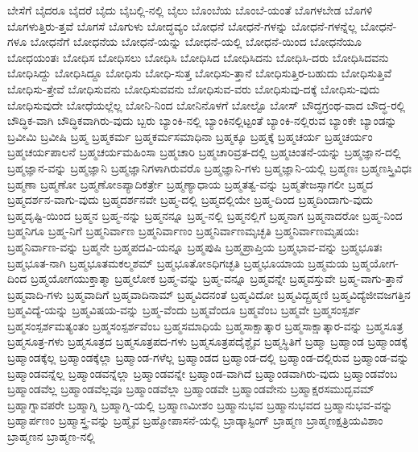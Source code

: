{ಬೇಸೆಗೆ
ಬೈದರೂ
ಬೈದರೆ
ಬೈದು
ಬೈಬಲ್ಲಿ-ನಲ್ಲಿ
ಬೈಲು
ಬೊಂಬೆಯ
ಬೊಂಬೆ-ಯಂತೆ
ಬೊಗಳಬೇಡ
ಬೊಗಳಿ
ಬೊಗಳುತ್ತಿರು-ತ್ತವೆ
ಬೊಗಸೆ
ಬೊಗುಳು
ಬೋದ್ಧವ್ಯಂ
ಬೋಧನೆ
ಬೋಧನೆ-ಗಳನ್ನು
ಬೋಧನೆ-ಗಳನ್ನೆಲ್ಲ
ಬೋಧನೆ-ಗಳೂ
ಬೋಧನೆಗೆ
ಬೋಧನೆಯ
ಬೋಧನೆ-ಯನ್ನು
ಬೋಧನೆ-ಯಲ್ಲಿ
ಬೋಧನೆ-ಯಿಂದ
ಬೋಧನೆಯೂ
ಬೋಧಯಂತಃ
ಬೋಧಿಸ
ಬೋಧಿಸಲು
ಬೋಧಿಸಿ
ಬೋಧಿಸಿದ
ಬೋಧಿಸಿದನು
ಬೋಧಿಸಿ-ದರು
ಬೋಧಿಸಿದವನು
ಬೋಧಿಸಿದ್ದು
ಬೋಧಿಸಿದ್ದೂ
ಬೋಧಿಸು
ಬೋಧಿ-ಸುತ್ತ
ಬೋಧಿಸು-ತ್ತಾನೆ
ಬೋಧಿಸುತ್ತಿರ-ಬಹುದು
ಬೋಧಿಸುತ್ತಿವೆ
ಬೋಧಿಸು-ತ್ತೇವೆ
ಬೋಧಿಸುವನು
ಬೋಧಿಸುವವನು
ಬೋಧಿಸುವ-ವರು
ಬೋಧಿಸುವು-ದಕ್ಕೆ
ಬೋಧಿಸು-ವುದು
ಬೋಧಿಸುವುದೇ
ಬೋಧೆಯಲ್ಲೆಲ್ಲ
ಬೋನಿ-ನಿಂದ
ಬೋನಿನೊಳಗೆ
ಬೋಲ್ಟೊ
ಬೋಸ್
ಬೌದ್ಧಗ್ರಂಥ-ವಾದ
ಬೌದ್ಧ-ರಲ್ಲಿ
ಬೌದ್ಧಿಕ-ವಾಗಿ
ಬೌದ್ಧಿಕವಾಗಿರು-ವುದು
ಬ್ಬರು
ಬ್ಯಾಂಕಿ-ನಲ್ಲಿ
ಬ್ಯಾಂಕಿನಲ್ಲಿಟ್ಟಂತೆ
ಬ್ಯಾಂಕಿ-ನಲ್ಲಿರುವ
ಬ್ಯಾಂಕೇ
ಬ್ಯಾಂಡನ್ನು
ಬ್ರವೀಮಿ
ಬ್ರವೀಷಿ
ಬ್ರಹ್ಮ
ಬ್ರಹ್ಮಕರ್ಮ
ಬ್ರಹ್ಮಕರ್ಮಸಮಾಧಿನಾ
ಬ್ರಹ್ಮಕ್ಕೂ
ಬ್ರಹ್ಮಕ್ಕೆ
ಬ್ರಹ್ಮಚರ್ಯ
ಬ್ರಹ್ಮಚರ್ಯಂ
ಬ್ರಹ್ಮಚರ್ಯಪಾಲನೆ
ಬ್ರಹ್ಮಚರ್ಯಮಹಿಂಸಾ
ಬ್ರಹ್ಮಚಾರಿ
ಬ್ರಹ್ಮಚಾರಿವ್ರತ-ದಲ್ಲಿ
ಬ್ರಹ್ಮಚಿಂತನೆ-ಯನ್ನು
ಬ್ರಹ್ಮಜ್ಞಾನ-ದಲ್ಲಿ
ಬ್ರಹ್ಮಜ್ಞಾನ-ವನ್ನು
ಬ್ರಹ್ಮಜ್ಞಾನಿ
ಬ್ರಹ್ಮಜ್ಞಾನಿಗಳಾಗಿರುವರೊ
ಬ್ರಹ್ಮಜ್ಞಾನಿ-ಗಳು
ಬ್ರಹ್ಮಜ್ಞಾನಿ-ಯಲ್ಲಿ
ಬ್ರಹ್ಮಣಃ
ಬ್ರಹ್ಮಣಸ್ತ್ರಿವಿಧಃ
ಬ್ರಹ್ಮಣಾ
ಬ್ರಹ್ಮಣೋ
ಬ್ರಹ್ಮಣೋಽಪ್ಯಾದಿಕರ್ತ್ರೇ
ಬ್ರಹ್ಮಣ್ಯಾಧಾಯ
ಬ್ರಹ್ಮತತ್ವ-ವನ್ನು
ಬ್ರಹ್ಮತೇಜಸ್ಸಾಗಲೀ
ಬ್ರಹ್ಮದ
ಬ್ರಹ್ಮದರ್ಶನ-ವಾಗು-ವುದು
ಬ್ರಹ್ಮದರ್ಶನವೇ
ಬ್ರಹ್ಮ-ದಲ್ಲಿ
ಬ್ರಹ್ಮದಲ್ಲಿಯೇ
ಬ್ರಹ್ಮ-ದಿಂದ
ಬ್ರಹ್ಮದಿಂದಾಗು-ವುದು
ಬ್ರಹ್ಮದೃಷ್ಟಿ-ಯಿಂದ
ಬ್ರಹ್ಮನ
ಬ್ರಹ್ಮ-ನನ್ನು
ಬ್ರಹ್ಮನನ್ನೂ
ಬ್ರಹ್ಮ-ನಲ್ಲಿ
ಬ್ರಹ್ಮನಲ್ಲಿಗೆ
ಬ್ರಹ್ಮನಾಗ
ಬ್ರಹ್ಮನಾದರೋ
ಬ್ರಹ್ಮ-ನಿಂದ
ಬ್ರಹ್ಮನಿಗೂ
ಬ್ರಹ್ಮ-ನಿಗೆ
ಬ್ರಹ್ಮನಿರ್ವಾಣ
ಬ್ರಹ್ಮನಿರ್ವಾಣಂ
ಬ್ರಹ್ಮನಿರ್ವಾಣಮೃಚ್ಛತಿ
ಬ್ರಹ್ಮನಿರ್ವಾಣಮೃಷಯಃ
ಬ್ರಹ್ಮನಿರ್ವಾಣ-ವನ್ನು
ಬ್ರಹ್ಮನೇ
ಬ್ರಹ್ಮಪದವಿ-ಯನ್ನೂ
ಬ್ರಹ್ಮಪುಷಿ
ಬ್ರಹ್ಮಪ್ರಾಪ್ತಿಯ
ಬ್ರಹ್ಮಭಾವ-ವನ್ನು
ಬ್ರಹ್ಮಭೂತಃ
ಬ್ರಹ್ಮಭೂತ-ನಾಗಿ
ಬ್ರಹ್ಮಭೂತಮಕಲ್ಮಶಮ್
ಬ್ರಹ್ಮಭೂತೋಽಧಿಗಚ್ಛತಿ
ಬ್ರಹ್ಮಭೂಯಾಯ
ಬ್ರಹ್ಮಮಯ
ಬ್ರಹ್ಮಯೋಗ-ದಿಂದ
ಬ್ರಹ್ಮಯೋಗಯುಕ್ತಾತ್ಮಾ
ಬ್ರಹ್ಮಲೋಕ
ಬ್ರಹ್ಮ-ವನ್ನು
ಬ್ರಹ್ಮ-ವನ್ನೂ
ಬ್ರಹ್ಮವನ್ನೇ
ಬ್ರಹ್ಮವಸ್ತುವೇ
ಬ್ರಹ್ಮ-ವಾಗು-ತ್ತಾನೆ
ಬ್ರಹ್ಮವಾದಿ-ಗಳು
ಬ್ರಹ್ಮವಾದಿಗೆ
ಬ್ರಹ್ಮವಾದಿನಾಮ್
ಬ್ರಹ್ಮವಿದನಂತೆ
ಬ್ರಹ್ಮವಿದೋ
ಬ್ರಹ್ಮವಿದ್ಬ್ರಹ್ಮಣಿ
ಬ್ರಹ್ಮವಿದ್ಯೆಜೀವಜಗತ್ತಿನ
ಬ್ರಹ್ಮವಿದ್ಯೆ-ಯನ್ನು
ಬ್ರಹ್ಮವಿಷಯ-ವನ್ನು
ಬ್ರಹ್ಮ-ವೆಂದು
ಬ್ರಹ್ಮವೆಂದೂ
ಬ್ರಹ್ಮವೆಂಬ
ಬ್ರಹ್ಮವೇ
ಬ್ರಹ್ಮಸಂಸ್ಪರ್ಶ
ಬ್ರಹ್ಮಸಂಸ್ಪರ್ಶಮತ್ಯಂತಂ
ಬ್ರಹ್ಮಸಂಸ್ಪರ್ಶವೆಂಬ
ಬ್ರಹ್ಮಸಮಾಧಿಯೆ
ಬ್ರಹ್ಮಸಾಕ್ಷಾತ್ಕಾರ
ಬ್ರಹ್ಮಸಾಕ್ಷಾತ್ಕಾರ-ವನ್ನು
ಬ್ರಹ್ಮಸೂತ್ರ
ಬ್ರಹ್ಮಸೂತ್ರ-ಗಳು
ಬ್ರಹ್ಮಸೂತ್ರದ
ಬ್ರಹ್ಮಸೂತ್ರಪದ-ಗಳು
ಬ್ರಹ್ಮಸೂತ್ರಪದೈಶ್ಚೈವ
ಬ್ರಹ್ಮಸ್ಥಿತಿಗೆ
ಬ್ರಹ್ಮಾ
ಬ್ರಹ್ಮಾಂಡ
ಬ್ರಹ್ಮಾಂಡಕ್ಕೆ
ಬ್ರಹ್ಮಾಂಡಕ್ಕೆಲ್ಲ
ಬ್ರಹ್ಮಾಂಡಕ್ಕೆಲ್ಲಾ
ಬ್ರಹ್ಮಾಂಡ-ಗಳೆಲ್ಲ
ಬ್ರಹ್ಮಾಂಡದ
ಬ್ರಹ್ಮಾಂಡ-ದಲ್ಲಿ
ಬ್ರಹ್ಮಾಂಡ-ದಲ್ಲಿರುವ
ಬ್ರಹ್ಮಾಂಡ-ವನ್ನು
ಬ್ರಹ್ಮಾಂಡವನ್ನೆಲ್ಲ
ಬ್ರಹ್ಮಾಂಡವನ್ನೆಲ್ಲಾ
ಬ್ರಹ್ಮಾಂಡವನ್ನೇ
ಬ್ರಹ್ಮಾಂಡ-ವಾಗಿದೆ
ಬ್ರಹ್ಮಾಂಡವಾಗಿರು-ವುದು
ಬ್ರಹ್ಮಾಂಡವೆಂಬ
ಬ್ರಹ್ಮಾಂಡವೆಲ್ಲ
ಬ್ರಹ್ಮಾಂಡವೆಲ್ಲವೂ
ಬ್ರಹ್ಮಾಂಡವೆಲ್ಲಾ
ಬ್ರಹ್ಮಾಂಡವೇ
ಬ್ರಹ್ಮಾಂಡವೇನು
ಬ್ರಹ್ಮಾಕ್ಷರಸಮುದ್ಭವಮ್
ಬ್ರಹ್ಮಾಗ್ನಾವಪರೇ
ಬ್ರಹ್ಮಾಗ್ನಿ
ಬ್ರಹ್ಮಾಗ್ನಿ-ಯಲ್ಲಿ
ಬ್ರಹ್ಮಾಣಮೀಶಂ
ಬ್ರಹ್ಮಾನುಭವ
ಬ್ರಹ್ಮಾನುಭವದ
ಬ್ರಹ್ಮಾನುಭವ-ವನ್ನು
ಬ್ರಹ್ಮಾರ್ಪಣಂ
ಬ್ರಹ್ಮಾಸ್ತ್ರ-ವನ್ನು
ಬ್ರಹ್ಮೈವ
ಬ್ರಹ್ಮೋಪಾಸನೆ-ಯಲ್ಲಿ
ಬ್ರಾಡ್ಕಾಸ್ಟಿಂಗ್
ಬ್ರಾಹ್ಮಣ
ಬ್ರಾಹ್ಮಣಕ್ಷತ್ರಿಯವಿಶಾಂ
ಬ್ರಾಹ್ಮಣನ
ಬ್ರಾಹ್ಮಣ-ನಲ್ಲಿ
}
